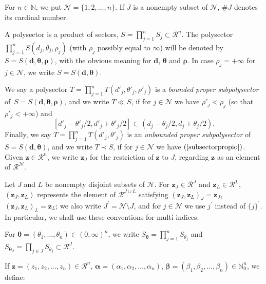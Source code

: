 \documentclass[11pt,a4paper,leqno]{article}
\theoremstyle{plain}
\theoremstyle{definition}
\def\N{\mathbb{N}}
\def\a{\alpha}
\def\b{\beta}
\def\balpha{\boldsymbol{\alpha}}
\def\bbeta{\boldsymbol{\beta}}
\def\bro{\boldsymbol{\rho}}
\def\btheta{\boldsymbol{\theta}}
\def\bd{\boldsymbol{d}}
\def\bz{\boldsymbol{z}}
\begin{document}
\noindent For $n\in\N$, we put $\mathcal{N}=\{1,2,\ldots,n\}$. If $J$ is a nonempty subset of $\mathcal{N}$,  $\#J$ denotes its cardinal number.\par\noindent
A polysector is a product of sectors, $S=\prod_{j=1}^n S_j\subset\mathcal{R}^n$.
The polysector $\prod_{j=1}^n S(d_j,\theta_j,\rho_j)$ (with $\rho_j$ possibly equal to $\infty$)
will be denoted by $S=S(\bd, \btheta, \bro)$, with the obvious meaning for $\bd$, $\btheta$ and $\bro$. In case $\rho_j=+\infty$ for
$j\in\mathcal{N}$, we write $S=S(\bd,\btheta)$.\par\noindent
We say a polysector $T=\prod_{j=1}^n T(d'_j,\theta'_j,\rho'_j)$
is a {\it bounded proper subpolysector}
of~$S=S(\bd, \btheta, \bro)$, and we write $T\ll S$, if
for $j\in\mathcal{N}$ we have $\rho'_j<\rho_j$ (so that $\rho'_j<+\infty$) and
\begin{equation}\label{subsectorpropio}
[d'_j-\theta'_j/2,d'_j+\theta'_j/2]\subset (d_j-\theta_j/2,d_j+\theta_j/2).
\end{equation}
Finally, we say $T=\prod_{j=1}^n T(d'_j,\theta'_j)$
is an {\it unbounded proper subpolysector}
of~$S=S(\bd, \btheta)$, and we write $T\prec S$, if
for $j\in\mathcal{N}$ we have $(\ref{subsectorpropio})$.
Given $\bz\in\mathcal{R}^n$, we write $\bz_J$ for the restriction of $\bz$ to $J$, regarding
$\bz$ as an element of $\mathcal{R}^{\mathcal{N}}$.\par\noindent
Let $J$ and $L$ be nonempty disjoint subsets of $\mathcal{N}$. For
$\bz_J\in\mathcal{R}^J$ and $\bz_L\in\mathcal{R}^L$, $(\bz_J,
\bz_L)$ represents the element of $\mathcal{R}^{J\cup L}$ satisfying
$
(\bz_J, \bz_L)_J=\bz_J
$,
$
(\bz_J, \bz_L)_L=\bz_L
$;
we also write
$J^{\prime}=\mathcal{N}\setminus J$, and for $j\in \mathcal{N}$ we use $j^{\prime}$ instead of $\{j\}^{\prime}$.
In particular, we shall use these conventions for
multi-indices.\par\noindent
For $\btheta=(\theta_1,\ldots,\theta_n)\in(0,\infty)^n$, we write $S_{\btheta}=\prod_{j=1}^nS_{\theta_j}$ and $S_{\btheta_J}=\prod_{j\in J}S_{\theta_j}\subset\mathcal{R}^J$.\par\noindent
If $\boldsymbol{z}=(z_{1},z_{2},\ldots,z_{n})\in\mathcal{R}^{n}$, $\balpha=(\a_{1},\a_{2},\ldots,\a_{n})$, $\bbeta=(\b_{1},\b_{2},\ldots,\b_{n})\in\N_0^{n}$, we define:
\end{document}
